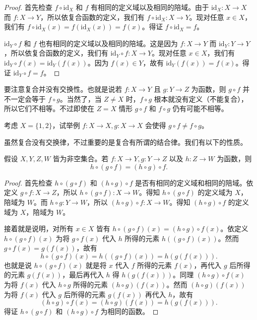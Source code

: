 \begin{proof}
首先检查 $f \circ \mathrm{id}_X$ 和 $f$ 有相同的定义域以及相同的陪域。由于 $\mathrm{id}_X : X \to X$ 而 $f : X \to Y$，所以依复合函数的定义，我们有 $f \circ \mathrm{id}_X : X \to Y$。现对任意 $x \in X$，我们有 $f \circ \mathrm{id}_X(x) = f(\mathrm{id}_X(x)) = f(x)$。得证 $f \circ \mathrm{id}_X = f$。

$\mathrm{id}_Y \circ f$ 和 $f$ 也有相同的定义域以及相同的陪域。这是因为 $f : X \to Y$ 而 $\mathrm{id}_Y : Y \to Y$，所以依复合函数的定义，我们有 $\mathrm{id}_Y \circ f : X \to Y$。现对任意 $x \in X$，我们有 $\mathrm{id}_Y \circ f(x) = \mathrm{id}_Y(f(x))$。因为 $f(x) \in Y$，故有 $\mathrm{id}_Y(f(x)) = f(x)$。得证 $\mathrm{id}_Y \circ f = f$。
\end{proof}

要注意复合并没有交换性。也就是说若 $f : X \to Y$ 且 $g : Y \to Z$ 为函数，则 $g \circ f$ 并不一定会等于 $f \circ g$。当然了，当 $Z \neq X$ 时，$f \circ g$ 根本就没有定义（不能复合），所以它们不相等。不过即使在 $Z = X$ 情形 $g \circ f$ 和 $f \circ g$ 仍有可能不相等。

\begin{question}
考虑 $X = \{1, 2\}$，试举例 $f : X \to X, g : X \to X$ 会使得 $g \circ f \neq f \circ g$。
\end{question}

虽然复合没有交换律，不过重要的是复合有所谓的结合律。我们有以下的性质。

\begin{proposition}
假设 $X, Y, Z, W$ 皆为非空集合。若 $f : X \to Y, g : Y \to Z$ 以及 $h : Z \to W$ 为函数，则
$$ h \circ (g \circ f) = (h \circ g) \circ f. $$
\end{proposition}

\begin{proof}
首先检查 $h \circ (g \circ f)$ 和 $(h \circ g) \circ f$ 是否有相同的定义域和相同的陪域。依定义 $g \circ f : X \to Z$，所以 $h \circ (g \circ f) : X \to W$。得知 $h \circ (g \circ f)$ 的定义域为 $X$，陪域为 $W$。而 $h \circ g : Y \to W$，所以 $(h \circ g) \circ f : X \to W$。得知 $(h \circ g) \circ f$ 的定义域为 $X$，陪域为 $W$。

接着就是说明，对所有 $x \in X$ 皆有 $h \circ (g \circ f)(x) = (h \circ g) \circ f(x)$。依定义 $h \circ (g \circ f)(x)$ 为将 $g \circ f(x)$ 代入 $h$ 所得的元素 $h((g \circ f)(x))$。然而 $g \circ f(x) = g(f(x))$，故有
$$ h \circ (g \circ f)(x) = h((g \circ f)(x)) = h(g(f(x))). $$
也就是说 $h \circ (g \circ f)(x)$ 就是将 $x$ 代入 $f$ 所得的元素 $f(x)$，再代入 $g$ 后所得的元素 $g(f(x))$，最后再代入 $h$ 得 $h(g(f(x)))$。同理 $(h \circ g) \circ f(x)$ 为将 $f(x)$ 代入 $h \circ g$ 所得的元素 $(h \circ g)(f(x))$。然而 $(h \circ g)(f(x))$ 为将 $f(x)$ 代入 $g$ 后所得的元素 $g(f(x))$ 再代入 $h$，故有
$$ (h \circ g) \circ f(x) = (h \circ g)(f(x)) = h(g(f(x))). $$
得证 $h \circ (g \circ f)$ 和 $(h \circ g) \circ f$ 为相同的函数。
\end{proof}

